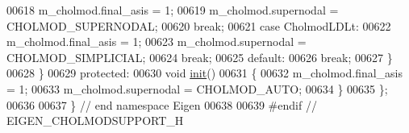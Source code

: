 \begin{DoxyCode}
00618           m\_cholmod.final\_asis = 1;
00619           m\_cholmod.supernodal = CHOLMOD\_SUPERNODAL;
00620           \textcolor{keywordflow}{break};
00621         \textcolor{keywordflow}{case} CholmodLDLt:
00622           m\_cholmod.final\_asis = 1;
00623           m\_cholmod.supernodal = CHOLMOD\_SIMPLICIAL;
00624           \textcolor{keywordflow}{break};
00625         \textcolor{keywordflow}{default}:
00626           \textcolor{keywordflow}{break};
00627       \}
00628     \}
00629   \textcolor{keyword}{protected}:
00630     \textcolor{keywordtype}{void} \hyperlink{structinit}{init}()
00631     \{
00632       m\_cholmod.final\_asis = 1;
00633       m\_cholmod.supernodal = CHOLMOD\_AUTO;
00634     \}
00635 \};
00636 
00637 \} \textcolor{comment}{// end namespace Eigen}
00638 
00639 \textcolor{preprocessor}{#endif // EIGEN\_CHOLMODSUPPORT\_H}
\end{DoxyCode}
